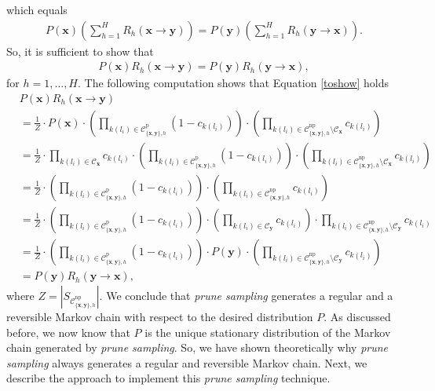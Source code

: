\documentclass[a4paper, twoside, 11pt]{report}
\newcommand{\bfx}{{\mathbf{x}}}
\newcommand{\C}{{\mathcal C}}
\theoremstyle{plain}
\theoremstyle{definition}
\theoremstyle{remark}
\newcommand{\ps}{\textit{prune sampling }}
\newcommand{\bfy}{{\mathbf{y}}}
\begin{document}
which equals
\begin{align*}
P(\mathbf{x}) \left(\sum_{h=1}^{H} {R}_h (\mathbf{x} \to \mathbf{y}) \right) = P(\mathbf{y}) \left(\sum_{h=1}^{H} {R}_h (\mathbf{y} \to \mathbf{x}) \right).
\end{align*}
So, it is sufficient to show that
\begin{align} \label{toshow}
P(\mathbf{x}) {R}_h (\mathbf{x} \to \mathbf{y}) = P(\mathbf{y})  {R}_h (\mathbf{y} \to \mathbf{x}), 
\end{align}
for $h = 1, \ldots, H$. The following computation shows that Equation \eqref{toshow} holds
\begin{align*}
&P(\mathbf{x}) {R}_h (\mathbf{x} \to \mathbf{y}) \\
&= \frac{1}{Z} \cdot P(\mathbf{x}) \cdot \left(\prod_{k(l_i) \in \C_{\{\bfx, \bfy\},h}^{\text{p}} } (1-c_{k(l_i)}) \right)\cdot \left( \prod_{k(l_i) \in \C_{\{\bfx, \bfy\},h}^{\text{np}}  \setminus \mathcal{C}_{\mathbf{x}} } c_{k(l_i)} \right) \\ 
&= \frac{1}{Z} \cdot \prod_{k(l_i) \in \mathcal{C}_{\mathbf{x}}} c_{k(l_i)} \cdot \left(\prod_{k(l_i) \in \C_{\{\bfx, \bfy\},h}^{\text{p}} } (1-c_{k(l_i)}) \right)\cdot \left( \prod_{k(l_i) \in \C_{\{\bfx, \bfy\},h}^{\text{np}} \setminus \mathcal{C}_{\mathbf{x}} } c_{k(l_i)} \right) \\ 
&= \frac{1}{Z} \cdot \left(\prod_{k(l_i) \in \C_{\{\bfx, \bfy\},h}^{\text{p}}} (1-c_{k(l_i)}) \right)\cdot \left( \prod_{k(l_i) \in \C_{\{\bfx, \bfy\},h}^{\text{np}}   } c_{k(l_i)}   \right) \\ 
&= \frac{1}{Z} \cdot \left(\prod_{k(l_i) \in \C_{\{\bfx, \bfy\},h}^{\text{p}}} (1-c_{k(l_i)}) \right)\cdot \left( \prod_{k(l_i) \in \mathcal{C}_{\mathbf{y}}} c_{k(l_i)}   \right) \cdot  \prod_{k(l_i) \in \C_{\{\bfx, \bfy\},h}^{\text{np}} \setminus \mathcal{C}_{\mathbf{y}}  } c_{k(l_i)} \\ 
&= \frac{1}{Z} \cdot \left(\prod_{k(l_i) \in \C_{\{\bfx, \bfy\},h}^{\text{p}} } (1-c_{k(l_i)}) \right)\cdot P(\mathbf{y}) \cdot\left( \prod_{k(l_i) \in \C_{\{\bfx, \bfy\},h}^{\text{np}}  \setminus \mathcal{C}_{\mathbf{y}}  } c_{k(l_i)}   \right) \\ 
&= P(\mathbf{y}) {R}_h (\mathbf{y} \to \mathbf{x}),
\end{align*}
\noindent where $Z = |S_{\C_{\{\bfx, \bfy\},h}^{\text{np}} }|$. We conclude that \ps generates a regular and a reversible Markov chain with respect to the desired distribution $P$. As discussed before, we now know that $P$ is the unique stationary distribution of the Markov chain generated by \textit{prune sampling}. So, we have shown theoretically why \ps always generates a regular and reversible Markov chain. Next, we describe the approach to implement this \ps technique.
\end{document}
